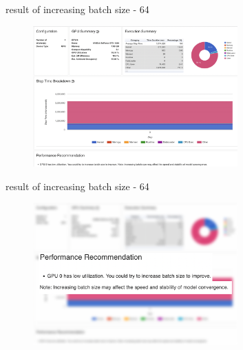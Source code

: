 \documentclass[compress,aspectratio=169]{beamer}
\begin{document}
\begin{frame}{result of increasing batch size - 64}
	\vspace{-1em}
\begin{center}
    \begin{figure}
        \includegraphics[width=0.7\textwidth]{../../data/scap_gtx1080_profiler-torch_batch-size-64_14650758}
    \end{figure}
    \end{center}

\end{frame}

\begin{frame}{result of increasing batch size - 64}
	\vspace{-1em}
\begin{center}
    \begin{figure}
        \includegraphics[width=0.7\textwidth]{../../data/scap_gtx1080_profiler-torch_batch-size-64_14650758_zoom}
    \end{figure}
    \end{center}

\end{frame}
\end{document}

